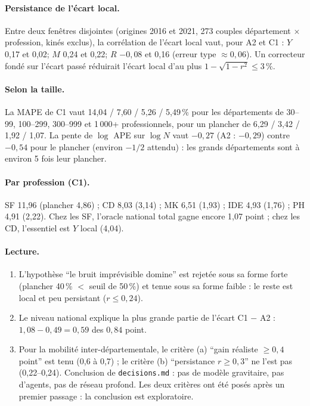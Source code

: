 \paragraph{Persistance de l'écart local.} Entre deux fenêtres disjointes (origines 2016 et 2021,
273\mesure{} couples département $\times$ profession, kinés exclus), la corrélation de l'écart local vaut,
pour A2 et C1 : $Y$ 0,17 et 0,02\mesure ; $M$ 0,24 et 0,22\mesure ; $R$ $-0{,}08$ et 0,16\mesure{} (erreur
type $\approx 0{,}06$\derive). Un correcteur fondé sur l'écart passé réduirait l'écart local d'au plus
$1 - \sqrt{1 - r^2} \le 3\,\%$\derive.

\paragraph{Selon la taille.} La MAPE de C1 vaut 14,04 / 7,60 / 5,26 / 5,49\,\%\mesure{} pour les
départements de 30--99, 100--299, 300--999 et 1\,000+ professionnels, pour un plancher de 6,29 / 3,42 /
1,92 / 1,07\derive. La pente de $\log$ APE sur $\log N$ vaut $-0{,}27$\mesure{} (A2 : $-0{,}29$\mesure)
contre $-0{,}54$\derive{} pour le plancher (environ $-1/2$ attendu) : les grands départements sont à environ
5 fois\derive{} leur plancher.

\paragraph{Par profession (C1).} SF 11,96 (plancher 4,86) ; CD 8,03 (3,14) ; MK 6,51 (1,93) ; IDE 4,93
(1,76) ; PH 4,91 (2,22)\mesure. Chez les SF, l'oracle national total gagne encore 1,07\mesure{} point ; chez
les CD, l'essentiel est $Y$ local (4,04\mesure).

\paragraph{Lecture.}
\begin{enumerate}
  \item L'hypothèse \enquote{le bruit imprévisible domine} est rejetée sous sa forme forte (plancher 40\,\%
    $<$ seuil de 50\,\%\suppose) et tenue sous sa forme faible : le reste est local et peu persistant
    ($r \le 0{,}24$\mesure).
  \item Le niveau national explique la plus grande partie de l'écart C1 $-$ A2 : $1{,}08 - 0{,}49 = 0{,}59$
    des $0{,}84$ point\derive.
  \item Pour la mobilité inter-départementale, le critère (a) \enquote{gain réaliste $\ge 0{,}4$ point} est
    tenu (0,6 à 0,7\mesure) ; le critère (b) \enquote{persistance $r \ge 0{,}3$} ne l'est pas
    (0,22--0,24\mesure). Conclusion de \texttt{decisions.md} : pas de modèle gravitaire, pas d'agents, pas
    de réseau profond. Les deux critères ont été posés après un premier passage : la conclusion est
    exploratoire.
\end{enumerate}

